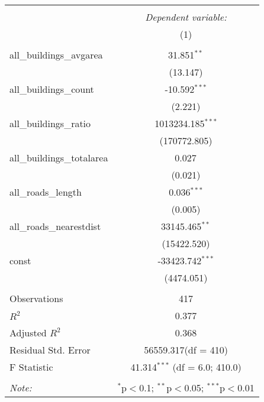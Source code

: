 \begin{table}[!htbp] \centering
\begin{tabular}{@{\extracolsep{5pt}}lc}
\\[-1.8ex]\hline
\hline \\[-1.8ex]
& \multicolumn{1}{c}{\textit{Dependent variable:}} \
\cr \cline{1-2}
\\[-1.8ex] & (1) \\
\hline \\[-1.8ex]
 all_buildings_avgarea & 31.851$^{**}$ \\
  & (13.147) \\
 all_buildings_count & -10.592$^{***}$ \\
  & (2.221) \\
 all_buildings_ratio & 1013234.185$^{***}$ \\
  & (170772.805) \\
 all_buildings_totalarea & 0.027$^{}$ \\
  & (0.021) \\
 all_roads_length & 0.036$^{***}$ \\
  & (0.005) \\
 all_roads_nearestdist & 33145.465$^{**}$ \\
  & (15422.520) \\
 const & -33423.742$^{***}$ \\
  & (4474.051) \\
\hline \\[-1.8ex]
 Observations & 417 \\
 $R^2$ & 0.377 \\
 Adjusted $R^2$ & 0.368 \\
 Residual Std. Error & 56559.317(df = 410)  \\
 F Statistic & 41.314$^{***}$ (df = 6.0; 410.0) \\
\hline
\hline \\[-1.8ex]
\textit{Note:} & \multicolumn{1}{r}{$^{*}$p$<$0.1; $^{**}$p$<$0.05; $^{***}$p$<$0.01} \\
\end{tabular}
\end{table}